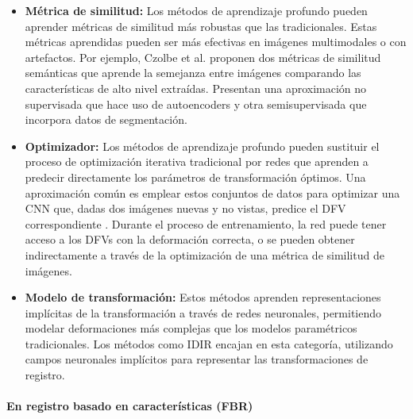 \begin{itemize}
\item \textbf{Métrica de similitud:} Los métodos de aprendizaje profundo pueden aprender métricas de similitud más robustas que las tradicionales. Estas métricas aprendidas pueden ser más efectivas en imágenes multimodales o con artefactos.
Por ejemplo, Czolbe et al. \cite{semanticsimilarity} proponen dos métricas de similitud semánticas que aprende la semejanza entre imágenes comparando las características de alto nivel extraídas. Presentan una aproximación no supervisada que hace uso de autoencoders y otra semisupervisada que incorpora datos de segmentación.
\item \textbf{Optimizador:} Los métodos de aprendizaje profundo pueden sustituir el proceso de optimización iterativa tradicional por redes que aprenden a predecir directamente los parámetros de transformación óptimos. Una aproximación común es emplear estos conjuntos de datos para optimizar una CNN que, dadas dos imágenes nuevas y no vistas, predice el DFV correspondiente \cite{defregcnn}. Durante el proceso de entrenamiento, la red puede tener acceso a los DFVs con la deformación correcta, o se pueden obtener indirectamente a través de la optimización de una métrica de similitud de imágenes.
\item \textbf{Modelo de transformación:} Estos métodos aprenden representaciones implícitas de la transformación a través de redes neuronales, permitiendo modelar deformaciones más complejas que los modelos paramétricos tradicionales. Los métodos como IDIR \cite{wolterink2021implicit} encajan en esta categoría, utilizando campos neuronales implícitos para representar las transformaciones de registro.
\end{itemize}

\paragraph{En registro basado en características (FBR)}
\label{par:FBR_substitution}

